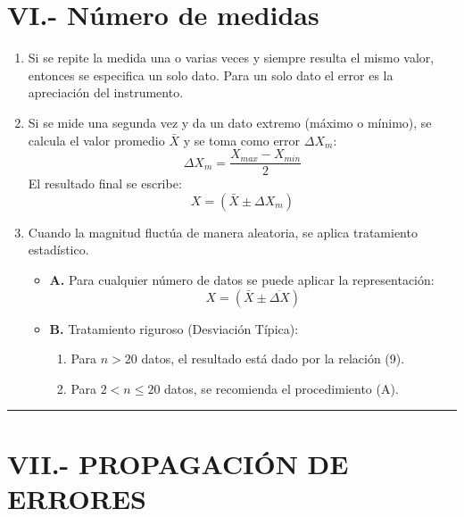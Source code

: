 \documentclass[12pt,a4paper]{article}
\begin{document}
\section{VI.- Número de medidas}

\begin{enumerate}
    \item Si se repite la medida una o varias veces y siempre resulta el mismo valor, entonces se especifica un solo dato. Para un solo dato el error es la apreciación del instrumento.
    \item Si se mide una segunda vez y da un dato extremo (máximo o mínimo), se calcula el valor promedio $\bar{X}$ y se toma como error $\Delta X_m$:
    \begin{equation}
    \Delta X_m = \frac{X_{max} - X_{min}}{2} \tag{12}
    \end{equation}
    El resultado final se escribe:
    \begin{equation}
    X = (\bar{X} \pm \Delta X_m) \tag{13}
    \end{equation}
    \item Cuando la magnitud fluctúa de manera aleatoria, se aplica tratamiento estadístico.
    \begin{itemize}
        \item \textbf{A.} Para cualquier número de datos se puede aplicar la representación:
        \begin{equation}
        X = (\bar{X} \pm \overline{\Delta X}) \tag{14}
        \end{equation}
        \item \textbf{B.} Tratamiento riguroso (Desviación Típica):
        \begin{enumerate}
            \item Para $n > 20$ datos, el resultado está dado por la relación (9).
            \item Para $2 < n \leq 20$ datos, se recomienda el procedimiento (A).
        \end{enumerate}
    \end{itemize}
\end{enumerate}

\vspace{0.5cm}
\hrule
\vspace{0.5cm}

\section{VII.- PROPAGACIÓN DE ERRORES}
\end{document}

